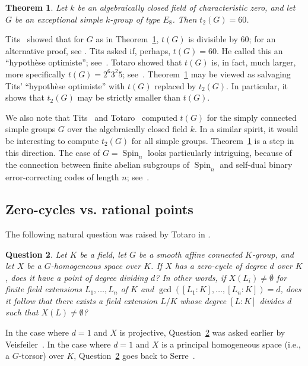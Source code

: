 \documentclass[12pt]{amsart}
\numberwithin{equation}{section}
\newtheorem{theorem}{Theorem}[section]
\newtheorem{question}[theorem]{Question}
\theoremstyle{remark}
\newcommand{\Spin}{\operatorname{Spin}}
\begin{document}
\begin{theorem} \label{thm.torsion-b} Let $k$ be an algebraically closed field of characteristic zero, and let $G$ be an exceptional simple $k$-group of type $E_8$. Then $t_2(G) =  60$.
\end{theorem}

 Tits~\cite[Proposition 9]{tits1992} showed that for $G$ as in Theorem~\ref{thm.torsion-b}, $t(G)$ is divisible by $60$; for an alternative proof, see \cite[Corollary 5.5]{reichstein-youssin2}.
  Tits asked if, perhaps, $t(G) = 60$. He called this an ``hypoth\`ese optimiste''; see~\cite[Section 5.2]{tits92}. Totaro showed that $t(G)$ is, in fact, much larger, more specifically $t(G) = 2^6 3^2 5$; see~\cite{totaro-E8}. Theorem~\ref{thm.torsion-b} may be viewed as salvaging Tits' ``hypoth\`ese optimiste'' with $t(G)$ replaced by $t_2(G)$. In particular, it shows that $t_2(G)$ may be strictly smaller than $t(G)$.

We also note that Tits~\cite{tits92} and Totaro~\cite{totaro-E8, totaro-spin} computed
$t(G)$ for the simply connected simple groups $G$ over the algebraically closed field $k$. In a similar spirit, it would be interesting to compute $t_2(G)$ for all simple groups. Theorem~\ref{thm.torsion-b} is a step in this direction.
The case of $G = \Spin_n$ looks particularly intriguing, because of the connection between finite abelian subgroups of $\Spin_n$ and self-dual binary error-correcting codes of length $n$; see~\cite{wood}.

\subsection{Zero-cycles vs. rational points}
The following natural question was raised by Totaro in 
\cite[Question 0.2]{totaro-splitting}.

\begin{question}\label{Totaro_question}
    Let $K$ be a field, let $G$ be a smooth affine connected $K$-group, and let $X$ be a $G$-homogeneous space over $K$. If $X$ has a zero-cycle of degree $d$ over $K$, does it have a point of degree dividing $d$? In other words, if
    $X(L_i) \neq \emptyset$ for finite field extensions $L_1,\dots,L_n$ of $K$ and $\gcd([L_1:K],\dots,[L_n:K]) = d$, does it follow that there exists a field extension $L/K$ whose degree $[L:K]$ divides $d$ such that $X(L) \neq \emptyset$? 
\end{question}

In the case where $d = 1$ and $X$ is projective, Question~\ref{Totaro_question} was asked earlier by Veisfeiler~\cite{veisfeiler}. In the case where $d=1$ and $X$ is a principal homogeneous space (i.e., a $G$-torsor) over $K$, Question~\ref{Totaro_question} goes back to Serre~\cite[Section 2.4, Question 2]{serre-pp}.
\end{document}
